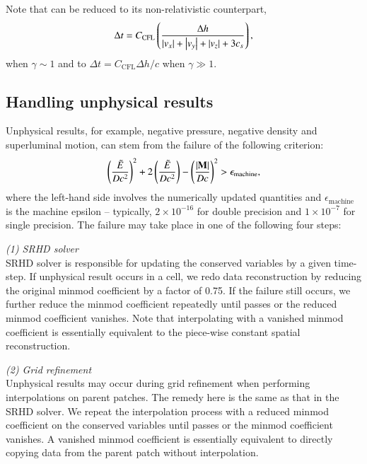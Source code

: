 \documentclass[twocolumn]{aastex63}
\begin{document}
Note that  can be reduced to its non-relativistic counterpart,
\begin{equation}
    \Delta t=C_{\text{CFL}}\left(\frac{\Delta h}{\abs{v_x}+\abs{v_y}+\abs{v_z}+3c_s}\right),
\end{equation}
when $\gamma\sim 1$ and to $\Delta t = C_{\text{CFL}}\Delta h/c$ when $\gamma \gg 1$.


\subsection{Handling unphysical results}
Unphysical results, for example, negative pressure, negative density and superluminal motion, can stem from the failure of the following criterion:
\begin{equation}
\left(\frac{\tilde{E}}{Dc^2}\right)^2+2\left(\frac{\tilde{E}}{Dc^2}\right)-\left(\frac{\abs{\mathbf{M}}}{Dc}\right)^2>\epsilon_{\text{machine}},
\label{Unphysical result}
\end{equation}
where the left-hand side involves the numerically updated quantities and $\epsilon_{\text{machine}}$ is the machine epsilon -- typically, $2\times10^{-16}$ for double precision and $1\times 10^{-7}$ for single precision. The failure may take place in one of the following four steps:

\emph{(1) SRHD solver}\\
SRHD solver is responsible for updating the conserved variables by a given time-step. If unphysical result occurs in a cell, we redo data reconstruction by reducing the original minmod coefficient by a factor of 0.75. If the failure still occurs, we further reduce the minmod coefficient repeatedly until  passes or the reduced minmod coefficient vanishes. Note that interpolating with a vanished minmod coefficient is essentially equivalent to the piece-wise constant spatial reconstruction.

\emph{(2) Grid refinement}\\
Unphysical results may occur during grid refinement when performing interpolations on parent patches. The remedy here is the same as that in the SRHD solver. We repeat the interpolation process with a reduced minmod coefficient on the conserved variables until  passes or the minmod coefficient vanishes. A vanished minmod coefficient is essentially equivalent to directly copying data from the parent patch without interpolation.
\end{document}
